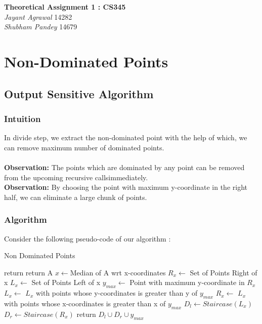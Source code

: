 \documentclass{article}
\begin{document}

\begin{center}
\textbf{\Large Theoretical Assignment 1 : CS345} \\
\textit{\large Jayant Agrawal}         14282 \\
\textit{\large Shubham Pandey}         14679
\end{center}

\section{Non-Dominated Points}

\subsection{Output Sensitive Algorithm}
\subsubsection{Intuition}
In divide step, we extract the non-dominated point with the help of which, we can remove maximum number of dominated points.\\ \\
\textbf{Observation: }The points which are dominated by any point can be removed from the upcoming recursive calls\newline immediately.\\
\textbf{Observation: }By choosing the point with maximum y-coordinate in the right half, we can eliminate a large chunk of points.

\subsubsection{Algorithm}
Consider the following pseudo-code of our algorithm :
\begin{algorithm}
\caption{Non Dominated Points}
\label{ndp}
\begin{algorithmic}[1]
\State return
\EndIf
{} 
\State return A
\Else
\State $x \gets $Median of A wrt x-coordinates  
\State $R_x \gets $ Set of Points Right of x   
\State $L_x \gets $ Set of Points Left of x   
\State $y_{max} \gets$ Point with maximum y-coordinate in $R_x$   
\State $L_x \gets$ $L_x$ with points whose y-coordinates is greater than y of $y_{max}$   
\State $R_x \gets$ $L_x$ with points whose x-coordinates is greater than x of $y_{max}$   
\State $D_l \gets Staircase(L_x)$    
\State $D_r \gets Staircase(R_x)$ 
\State return $D_l \cup D_r \cup y_{max} $
\EndIf
\EndProcedure
\end{algorithmic}
\end{algorithm}
\end{document}
